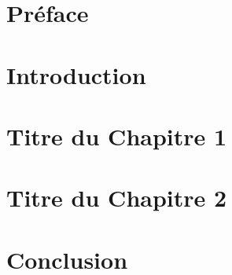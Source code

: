 \documentclass[12pt,a4paper]{report}
\begin{document}





\chapter*{Préface}

\tableofcontents
\newpage

\chapter{Introduction}
 

\chapter{Titre du Chapitre 1}
% 


\chapter{Titre du Chapitre 2}
% 

\chapter{Conclusion}


% 
% 



\end{document}
